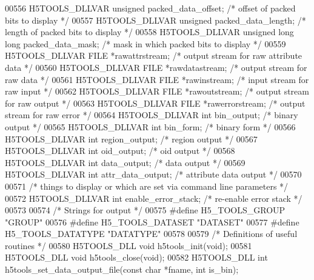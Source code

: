 \begin{DoxyCode}
{{{{{{{{{{{{{{{{{{{00556 H5TOOLS\_DLLVAR \textcolor{keywordtype}{unsigned} packed\_data\_offset; \textcolor{comment}{/* offset of packed bits to display */}
00557 H5TOOLS\_DLLVAR \textcolor{keywordtype}{unsigned} packed\_data\_length; \textcolor{comment}{/* length of packed bits to display */}
00558 H5TOOLS\_DLLVAR \textcolor{keywordtype}{unsigned} \textcolor{keywordtype}{long} \textcolor{keywordtype}{long} packed\_data\_mask;  \textcolor{comment}{/* mask in which packed bits to display */}
00559 H5TOOLS\_DLLVAR FILE   *rawattrstream;       \textcolor{comment}{/* output stream for raw attribute data */}
00560 H5TOOLS\_DLLVAR FILE   *rawdatastream;       \textcolor{comment}{/* output stream for raw data */}
00561 H5TOOLS\_DLLVAR FILE   *rawinstream;         \textcolor{comment}{/* input stream for raw input */}
00562 H5TOOLS\_DLLVAR FILE   *rawoutstream;        \textcolor{comment}{/* output stream for raw output */}
00563 H5TOOLS\_DLLVAR FILE   *rawerrorstream;      \textcolor{comment}{/* output stream for raw error */}
00564 H5TOOLS\_DLLVAR \textcolor{keywordtype}{int}     bin\_output;          \textcolor{comment}{/* binary output */}
00565 H5TOOLS\_DLLVAR \textcolor{keywordtype}{int}     bin\_form;            \textcolor{comment}{/* binary form */}
00566 H5TOOLS\_DLLVAR \textcolor{keywordtype}{int}     region\_output;       \textcolor{comment}{/* region output */}
00567 H5TOOLS\_DLLVAR \textcolor{keywordtype}{int}     oid\_output;          \textcolor{comment}{/* oid output */}
00568 H5TOOLS\_DLLVAR \textcolor{keywordtype}{int}     data\_output;         \textcolor{comment}{/* data output */}
00569 H5TOOLS\_DLLVAR \textcolor{keywordtype}{int}     attr\_data\_output;    \textcolor{comment}{/* attribute data output */}
00570 
00571 \textcolor{comment}{/* things to display or which are set via command line parameters */}
00572 H5TOOLS\_DLLVAR \textcolor{keywordtype}{int}     enable\_error\_stack; \textcolor{comment}{/* re-enable error stack */}
00573 
00574 \textcolor{comment}{/* Strings for output */}
00575 \textcolor{preprocessor}{#define H5\_TOOLS\_GROUP           "GROUP"}
00576 \textcolor{preprocessor}{#define H5\_TOOLS\_DATASET         "DATASET"}
00577 \textcolor{preprocessor}{#define H5\_TOOLS\_DATATYPE        "DATATYPE"}
00578 
00579 \textcolor{comment}{/* Definitions of useful routines */}
00580 H5TOOLS\_DLL \textcolor{keywordtype}{void}    h5tools\_init(\textcolor{keywordtype}{void});
00581 H5TOOLS\_DLL \textcolor{keywordtype}{void}    h5tools\_close(\textcolor{keywordtype}{void});
00582 H5TOOLS\_DLL \textcolor{keywordtype}{int}     h5tools\_set\_data\_output\_file(\textcolor{keyword}{const} \textcolor{keywordtype}{char} *fname, \textcolor{keywordtype}{int} is\_bin);
}}}}}}}}}}}}}}}}}}}
\end{DoxyCode}

